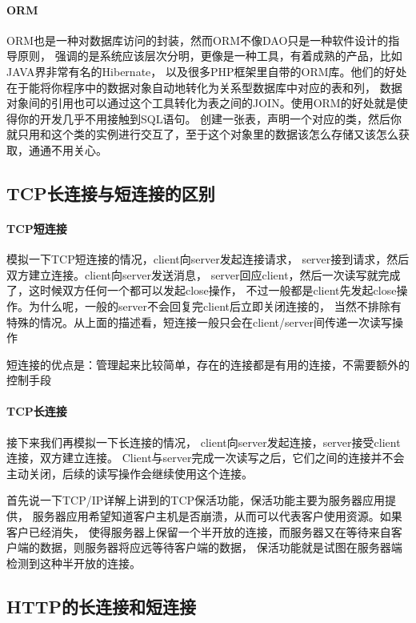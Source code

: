 \documentclass{book}
\begin{document}
\paragraph{ORM}ORM也是一种对数据库访问的封装，然而ORM不像DAO只是一种软件设计的指导原则，
强调的是系统应该层次分明，更像是一种工具，有着成熟的产品，比如JAVA界非常有名的Hibernate，
以及很多PHP框架里自带的ORM库。他们的好处在于能将你程序中的数据对象自动地转化为关系型数据库中对应的表和列，
数据对象间的引用也可以通过这个工具转化为表之间的JOIN。使用ORM的好处就是使得你的开发几乎不用接触到SQL语句。
创建一张表，声明一个对应的类，然后你就只用和这个类的实例进行交互了，至于这个对象里的数据该怎么存储又该怎么获取，通通不用关心。

\subsection{TCP长连接与短连接的区别}

\paragraph{TCP短连接}模拟一下TCP短连接的情况，client向server发起连接请求，
server接到请求，然后双方建立连接。client向server发送消息，
server回应client，然后一次读写就完成了，这时候双方任何一个都可以发起close操作，
不过一般都是client先发起close操作。为什么呢，一般的server不会回复完client后立即关闭连接的，
当然不排除有特殊的情况。从上面的描述看，短连接一般只会在client/server间传递一次读写操作

短连接的优点是：管理起来比较简单，存在的连接都是有用的连接，不需要额外的控制手段

\paragraph{TCP长连接}接下来我们再模拟一下长连接的情况，
client向server发起连接，server接受client连接，双方建立连接。
Client与server完成一次读写之后，它们之间的连接并不会主动关闭，后续的读写操作会继续使用这个连接。

首先说一下TCP/IP详解上讲到的TCP保活功能，保活功能主要为服务器应用提供，
服务器应用希望知道客户主机是否崩溃，从而可以代表客户使用资源。如果客户已经消失，
使得服务器上保留一个半开放的连接，而服务器又在等待来自客户端的数据，则服务器将应远等待客户端的数据，
保活功能就是试图在服务器端检测到这种半开放的连接。

\subsection{HTTP的长连接和短连接}
\end{document}
